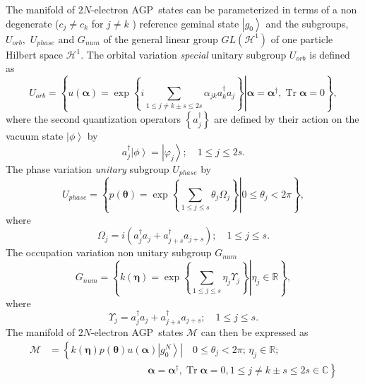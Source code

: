 \documentclass[aps,preprint]{revtex4}%
\begin{document}
The manifold of $2N$-electron AGP\ states can be parameterized in terms of a
non degenerate ($c_{j}\neq c_{k}$ for $j\neq k$ ) reference geminal state
$\left\vert g_{0}\right\rangle $ and the subgroups, $U_{orb},$ $U_{phase}$ and
$G_{num}$ of the general linear group $GL\left(  \mathcal{H}^{1}\right)  $ of
one particle Hilbert space $\mathcal{H}^{1}$. The orbital variation
\emph{special} unitary subgroup $U_{orb}$ is defined as
\begin{equation}
U_{orb}=\left\{  \left.  u\left(  \bm{\alpha}\right)  =\exp\left\{
i\sum_{1\leq j\neq k\pm s\leq2s}\alpha_{jk}a_{k}^{\dagger}a_{j}\right\}
\right\vert \bm{\alpha}=\bm{\alpha}^{\dagger},\operatorname{Tr}%
\bm{\alpha}=0\right\}  , \label{orb}%
\end{equation}
where the second quantization operators $\left\{  a_{j}^{\dagger}\right\}  $
are defined by their action on the vacuum state $\left\vert \phi\right\rangle
$ by
\begin{equation}
a_{j}^{\dagger}\left\vert \phi\right\rangle =\left\vert \varphi_{j}%
\right\rangle ;\quad1\leq j\leq2s.
\end{equation}
The phase variation \emph{unitary} subgroup $U_{phase}$ by%
\begin{equation}
U_{phase}=\left\{  \left.  p\left(  \bm{\theta}\right)  =\exp\left\{
\sum_{1\leq j\leq s}\theta_{j}\Omega_{j}\right\}  \right\vert 0\leq\theta
_{j}<2\pi\right\}  , \label{phase}%
\end{equation}
where
\begin{equation}
\Omega_{j}=i\left(  a_{j}^{\dagger}a_{j}+a_{j+s}^{\dagger}a_{j+s}\right)
;\quad1\leq j\leq s.
\end{equation}
The occupation variation non unitary subgroup $G_{num}$
\begin{equation}
G_{num}=\left\{  \left.  k\left(  \bm{\eta}\right)  =\exp\left\{  \sum_{1\leq
j\leq s}\eta_{j}\Upsilon_{j}\right\}  \right\vert \eta_{j}\in\mathbb{R}%
\right\}  , \label{occup}%
\end{equation}
where
\begin{equation}
\Upsilon_{j}=a_{j}^{\dagger}a_{j}+a_{j+s}^{\dagger}a_{j+s};\quad1\leq j\leq s.
\end{equation}
The manifold of $2N$-electron AGP\ states $\mathcal{M}$ can then be expressed
as
\begin{align}
\mathcal{M}  &  \mathcal{=}\left\{  \left.  k\left(  \bm{\eta}\right)
p\left(  \bm{\theta}\right)  u\left(  \bm{\alpha}\right)  \left\vert g_{0}%
^{N}\right\rangle \right\vert \quad0\leq\theta_{j}<2\pi;\,\eta_{j}%
\in\mathbb{R};\right. \nonumber\\
&  \qquad\qquad\qquad\qquad\qquad\left.  \bm{\alpha}=\bm{\alpha }^{\dagger
},\operatorname{Tr}\bm{\alpha}=0,1\leq j\neq k\pm s\leq2s\in\mathbb{C}%
\right\}
\end{align}
\end{document}
